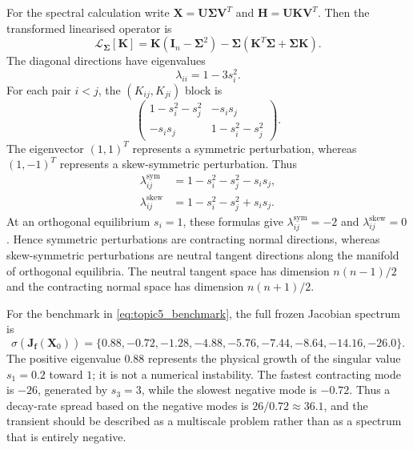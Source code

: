 For the spectral calculation write $\mathbf{X}=\mathbf{U}\boldsymbol{\Sigma}\mathbf{V}^T$ and $\mathbf{H}=\mathbf{U}\mathbf{K}\mathbf{V}^T$. Then the transformed linearised operator is
\begin{equation}
\label{eq:svd_linearised_operator}
\mathcal{L}_{\boldsymbol{\Sigma}}[\mathbf{K}]
=\mathbf{K}(\mathbf{I}_n-\boldsymbol{\Sigma}^2)
-\boldsymbol{\Sigma}(\mathbf{K}^T\boldsymbol{\Sigma}+\boldsymbol{\Sigma}\mathbf{K}).
\end{equation}
The diagonal directions have eigenvalues
\begin{equation}
\label{eq:diagonal_jacobian_eigenvalues}
\lambda_{ii}=1-3s_i^2.
\end{equation}
For each pair $i<j$, the $(K_{ij},K_{ji})$ block is
\begin{equation}
\label{eq:offdiagonal_jacobian_eigenvalues}
\begin{pmatrix}
1-s_i^2-s_j^2 & -s_i s_j \\
-s_i s_j & 1-s_i^2-s_j^2
\end{pmatrix}.
\end{equation}
The eigenvector $(1,1)^T$ represents a symmetric perturbation,
whereas $(1,-1)^T$ represents a skew-symmetric perturbation. Thus
\begin{align}
\lambda_{ij}^{\mathrm{sym}}
&=1-s_i^2-s_j^2-s_i s_j, \\
\lambda_{ij}^{\mathrm{skew}}
&=1-s_i^2-s_j^2+s_i s_j.
\end{align}
At an orthogonal equilibrium $s_i=1$, these formulas give
$\lambda_{ij}^{\mathrm{sym}}=-2$ and
$\lambda_{ij}^{\mathrm{skew}}=0$. Hence symmetric perturbations are
contracting normal directions, whereas skew-symmetric perturbations are
neutral tangent directions along the manifold of orthogonal equilibria.
The neutral tangent space has dimension $n(n-1)/2$ and the contracting
normal space has dimension $n(n+1)/2$.

For the benchmark in \eqref{eq:topic5_benchmark}, the full frozen Jacobian spectrum is
\begin{equation}
\label{eq:topic5_initial_spectrum}
\sigma\left(\mathbf{J}_{\mathbf{f}}(\mathbf{X}_0)\right)
=\{0.88,-0.72,-1.28,-4.88,-5.76,-7.44,-8.64,-14.16,-26.0\}.
\end{equation}
The positive eigenvalue $0.88$ represents the physical growth of the singular value $s_1=0.2$ toward $1$; it is not a numerical instability. The fastest contracting mode is $-26$, generated by $s_3=3$, while the slowest negative mode is $-0.72$. Thus a decay-rate spread based on the negative modes is $26/0.72\approx36.1$, and the transient should be described as a multiscale problem rather than as a spectrum that is entirely negative.

